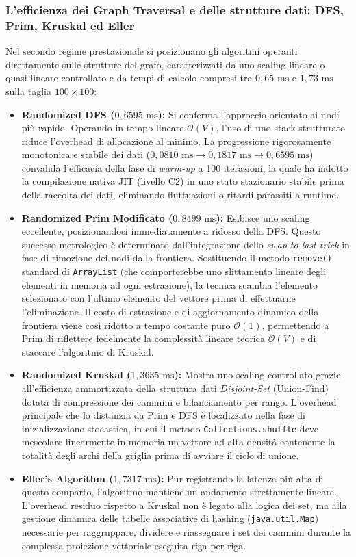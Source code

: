 \documentclass[12pt, a4paper]{article}
\begin{document}
	\subsubsection{L'efficienza dei Graph Traversal e delle strutture dati: DFS, Prim, Kruskal ed Eller}
	Nel secondo regime prestazionale si posizionano gli algoritmi operanti direttamente sulle strutture del grafo, caratterizzati da uno scaling lineare o quasi-lineare controllato e da tempi di calcolo compresi tra $0,65\text{ ms}$ e $1,73\text{ ms}$ sulla taglia $100\times100$:
	\begin{itemize}
		\item \textbf{Randomized DFS ($0,6595\text{ ms}$):} Si conferma l'approccio orientato ai nodi più rapido. Operando in tempo lineare $\mathcal{O}(V)$, l'uso di uno stack strutturato riduce l'overhead di allocazione al minimo. La progressione rigorosamente monotonica e stabile dei dati ($0,0810\text{ ms} \to 0,1817\text{ ms} \to 0,6595\text{ ms}$) convalida l'efficacia della fase di \textit{warm-up} a 100 iterazioni, la quale ha indotto la compilazione nativa JIT (livello C2) in uno stato stazionario stabile prima della raccolta dei dati, eliminando fluttuazioni o ritardi parassiti a runtime.
		\item \textbf{Randomized Prim Modificato ($0,8499\text{ ms}$):} Esibisce uno scaling eccellente, posizionandosi immediatamente a ridosso della DFS. Questo successo metrologico è determinato dall'integrazione dello \textit{swap-to-last trick} in fase di rimozione dei nodi dalla frontiera. Sostituendo il metodo \texttt{remove()} standard di \texttt{ArrayList} (che comporterebbe uno slittamento lineare degli elementi in memoria ad ogni estrazione), la tecnica scambia l'elemento selezionato con l'ultimo elemento del vettore prima di effettuarne l'eliminazione. Il costo di estrazione e di aggiornamento dinamico della frontiera viene così ridotto a tempo costante puro $\mathcal{O}(1)$, permettendo a Prim di riflettere fedelmente la complessità lineare teorica $\mathcal{O}(V)$ e di staccare l'algoritmo di Kruskal.
		\item \textbf{Randomized Kruskal ($1,3635\text{ ms}$):} Mostra uno scaling controllato grazie all'efficienza ammortizzata della struttura dati \textit{Disjoint-Set} (Union-Find) dotata di compressione dei cammini e bilanciamento per rango. L'overhead principale che lo distanzia da Prim e DFS è localizzato nella fase di inizializzazione stocastica, in cui il metodo \texttt{Collections.shuffle} deve mescolare linearmente in memoria un vettore ad alta densità contenente la totalità degli archi della griglia prima di avviare il ciclo di unione.
		\item \textbf{Eller's Algorithm ($1,7317\text{ ms}$):} Pur registrando la latenza più alta di questo comparto, l'algoritmo mantiene un andamento strettamente lineare. L'overhead residuo rispetto a Kruskal non è legato alla logica dei set, ma alla gestione dinamica delle tabelle associative di hashing (\texttt{java.util.Map}) necessarie per raggruppare, dividere e riassegnare i set dei cammini durante la complessa proiezione vettoriale eseguita riga per riga.
	\end{itemize}
	
\end{document}
